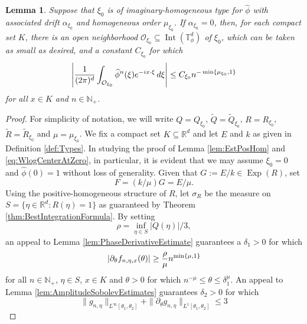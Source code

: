 \documentclass[11pt]{article}
\newtheorem{lemma}[theorem]{Lemma}
\theoremstyle{remark}
\newcommand\Exp{\operatorname{Exp}}
\newcommand\Interior{\operatorname{Int}}
\newcommand{\p}{\partial}
\newcommand{\f}[2]{\frac{#1}{#2}}
\begin{document}
\begin{lemma}\label{lem:EstImagHom}
Suppose that $\xi_0$ is of imaginary-homogeneous type for $\widehat{\phi}$ with associated drift $\alpha_{\xi_0}$ and homogeneous order $\mu_{\xi_0}$. If $\alpha_{\xi_0}=0$, then, for each compact set $K$, there is an open neighborhood $\mathcal{O}_{\xi_0}\subseteq\Interior(\mathbb{T}_\phi^d)$ of $\xi_0$, which can be taken as small as desired, and a constant $C_{\xi_0}$ for which
\begin{equation*}
    \abs{\f{1}{(2\pi)^d}\int_{\mathcal{O}_{\xi_0}}\widehat{\phi}^n(\xi)e^{-ix\cdot\xi}\,d\xi}\leq C_{\xi_0}n^{-\min\{\mu_{\xi_0},1\}}
\end{equation*}
for all $x\in K$ and $n\in\mathbb{N}_+$.
\end{lemma}
\begin{proof}
For simplicity of notation, we will write $Q=Q_{\xi_0}$, $\widetilde{Q}=\widetilde{Q}_{\xi_0}$, $R=R_{\xi_0}$, $\widetilde{R}=\widetilde{R}_{\xi_0}$ and $\mu=\mu_{\xi_0}$. We fix a compact set $K\subseteq\mathbb{R}^d$ and let $E$ and $k$ as given in Definition \ref{def:Types}. In studying the proof of Lemma \ref{lem:EstPosHom} and \eqref{eq:WlogCenterAtZero}, in particular, it is evident that we may assume $\xi_0=0$ and $\widehat{\phi}(0)=1$ without loss of generality. Given that $G:=E/k\in\Exp(R)$, set
\begin{equation*}
    F=(k/\mu)G=E/\mu.
\end{equation*} Using the positive-homogeneous structure of $R$, let $\sigma_R$ be the measure on $S=\{\eta\in \mathbb{R}^d:R(\eta)=1\}$ as guaranteed by Theorem \ref{thm:BestIntegrationFormula}. By setting
\begin{equation*}
    \rho=\inf_{\eta\in S}|Q(\eta)|/3,
\end{equation*}
an appeal to Lemma \ref{lem:PhaseDerivativeEstimate} guarantees a $\delta_1>0$ for which 
\begin{equation}\label{eq:EstImagHom1}
    \abs{\partial_{\theta}f_{n,\eta,x}(\theta)}\geq \frac{\rho}{\mu}n^{\min\{\mu,1\}}
\end{equation} for all $n\in\mathbb{N}_+$, $\eta\in S$, $x\in K$ and $\theta>0$ for which $n^{-\mu}\leq \theta\leq \delta_1^\mu$. An appeal to Lemma \ref{lem:AmplitudeSobolevEstimates} guarantees $\delta_2>0$ for which
\begin{equation}\label{eq:EstImagHom2}
    \|g_{n,\eta}\|_{L^\infty[\theta_1,\theta_2]}
    +
    \|\p_\theta g_{n,\eta} \|_{ L^1[\theta_1,\theta_2]}
    \leq 3
\end{equation}

\end{proof}
\end{document}
